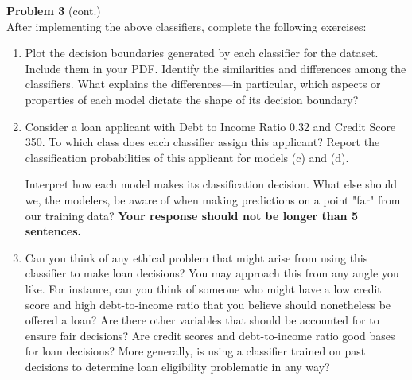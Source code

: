 \documentclass[submit]{../harvardml}
\begin{document}
\begin{framed}
  \noindent\textbf{Problem 3} (cont.)\\

After implementing the above classifiers, complete the following exercises:
  \begin{enumerate}

      \item Plot the decision boundaries generated by each classifier for the dataset. Include them in your PDF.
            Identify the similarities and differences among the classifiers. What explains the differences---in particular, which aspects or properties of each model dictate the shape of its decision boundary?
    
      \item
    
            Consider a loan applicant with Debt to Income Ratio 0.32 and Credit Score 350. To which class does each classifier assign this applicant? Report the classification probabilities of this applicant for models (c) and (d).
            
            Interpret how each model makes its classification decision. What else should we, the modelers, be aware of when making predictions on a point "far" from our training data? \textbf{Your response should not be longer than 5 sentences.}

    \item
        Can you think of any ethical problem that might arise from using this classifier to make loan decisions? You may approach this from any angle you like. For instance, can you think of someone who might have a low credit score and high debt-to-income ratio that you believe should nonetheless be offered a loan? Are there other variables that should be accounted for to ensure fair decisions? Are credit scores and debt-to-income ratio good bases for loan decisions? More generally, is using a classifier trained on past decisions to determine loan eligibility problematic in any way?
    \end{enumerate}
\end{framed}

\newpage
\end{document}
